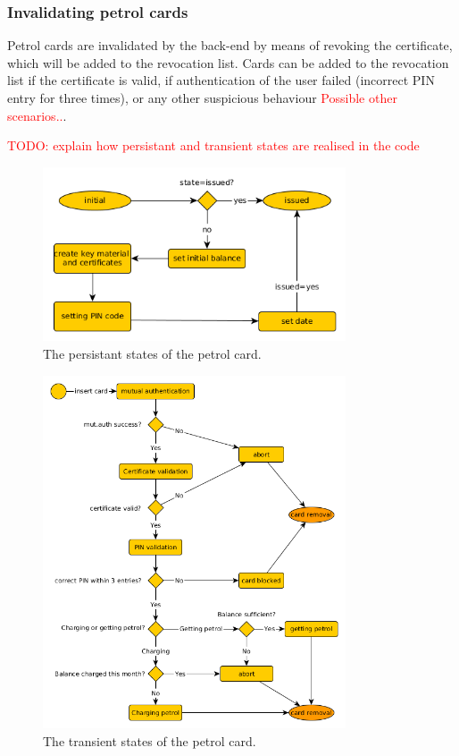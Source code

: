 \subsubsection{Invalidating petrol cards}
Petrol cards are invalidated by the back-end by means of revoking the certificate, which will be added to the revocation list. Cards can be added to the revocation list if the certificate is valid, if authentication of the user failed (incorrect PIN entry for three times), or any other suspicious behaviour \textcolor{red}{Possible other scenarios..}.


\textcolor{red}{TODO: explain how persistant and transient states are realised in the code }
\begin{figure}[!ht]
  \centering
    \includegraphics[width=0.8\textwidth]{persistant}
      \caption{The persistant states of the petrol card.}
\end{figure}

\begin{figure}[!ht]
  \centering
    \includegraphics[width=0.8\textwidth]{transient}
      \caption{The transient states of the petrol card.}
\end{figure}